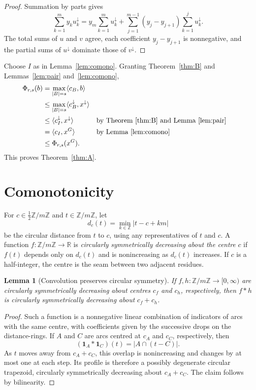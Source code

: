 \documentclass[11pt]{article}
\newtheorem{lemma}[theorem]{Lemma}
\theoremstyle{definition}
\newcommand{\Z}{\mathbb{Z}}
\newcommand{\R}{\mathbb{R}}
\newcommand{\ind}{\mathbf{1}}
\begin{document}
\begin{proof}
Summation by parts gives
\[
\sum_{k=1}^my_ku_k^\downarrow
=y_m\sum_{k=1}^mu_k^\downarrow
+\sum_{j=1}^{m-1}(y_j-y_{j+1})\sum_{k=1}^ju_k^\downarrow.
\]
The total sums of $u$ and $v$ agree, each coefficient $y_j-y_{j+1}$ is nonnegative, and the partial sums of $u^\downarrow$ dominate those of $v^\downarrow$.
\end{proof}

Choose $I$ as in Lemma~\ref{lem:comono}. Granting Theorem~\ref{thm:B} and Lemmas~\ref{lem:pair} and~\ref{lem:comono},
\[
\begin{aligned}
\Phi_{r,s}(b)
&=\max_{|B|=s}\langle c_B,b\rangle\\
&\le\max_{|B|=s}\langle c_B^\downarrow,x^\downarrow\rangle\\
&\le\langle c_I^\downarrow,x^\downarrow\rangle
&&\text{by Theorem~\ref{thm:B} and Lemma~\ref{lem:pair}}\\
&=\langle c_I,x^G\rangle
&&\text{by Lemma~\ref{lem:comono}}\\
&\le\Phi_{r,s}(x^G).
\end{aligned}
\]
This proves Theorem~\ref{thm:A}.

\section{Comonotonicity}\label{sec:comono}

For $c\in\frac12\Z/m\Z$ and $t\in\Z/m\Z$, let
\[
d_c(t)=\min_{k\in\Z}|t-c+km|
\]
be the circular distance from $t$ to $c$, using any representatives of $t$ and $c$. A function $f:\Z/m\Z\to\R$ is \emph{circularly symmetrically decreasing about the centre $c$} if $f(t)$ depends only on $d_c(t)$ and is nonincreasing as $d_c(t)$ increases. If $c$ is a half-integer, the centre is the seam between two adjacent residues.

\begin{lemma}[Convolution preserves circular symmetry]\label{lem:conv-sym}
If $f,h:\Z/m\Z\to[0,\infty)$ are circularly symmetrically decreasing about centres $c_f$ and $c_h$, respectively, then $f*h$ is circularly symmetrically decreasing about $c_f+c_h$.
\end{lemma}

\begin{proof}
Such a function is a nonnegative linear combination of indicators of arcs with the same centre, with coefficients given by the successive drops on the distance-rings. If $A$ and $C$ are arcs centred at $c_A$ and $c_C$, respectively, then
\[
(\ind_A*\ind_C)(t)=|A\cap(t-C)|.
\]
As $t$ moves away from $c_A+c_C$, this overlap is nonincreasing and changes by at most one at each step. Its profile is therefore a possibly degenerate circular trapezoid, circularly symmetrically decreasing about $c_A+c_C$. The claim follows by bilinearity.
\end{proof}
\end{document}
